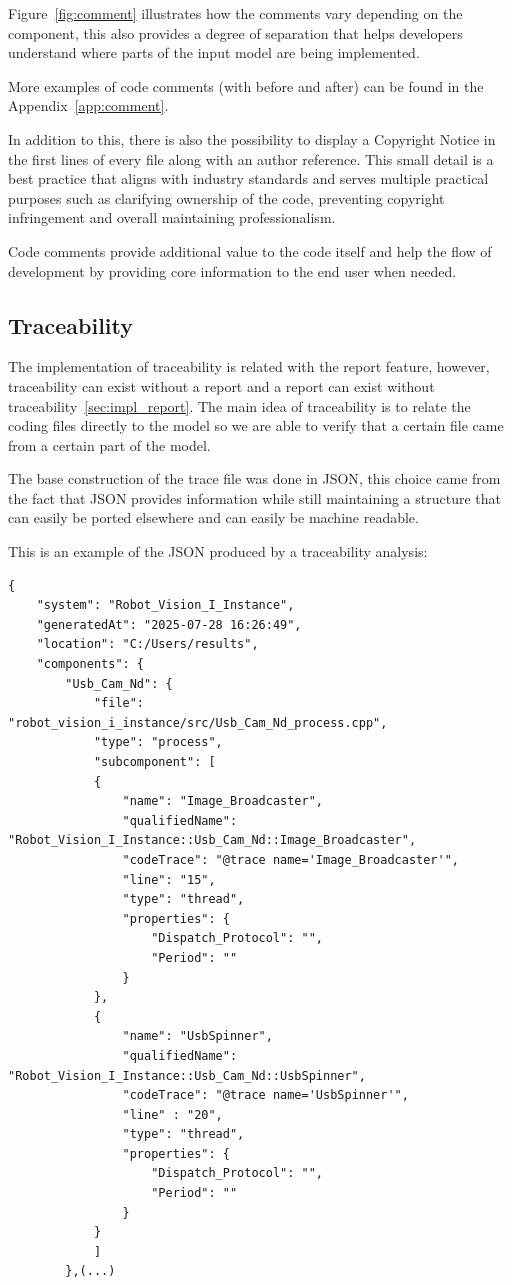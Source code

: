 Figure~\ref{fig:comment} illustrates how the comments vary depending on the component, this also provides a degree of separation that helps developers understand where parts of the input model are being implemented.

More examples of code comments (with before and after) can be found in the Appendix~\ref{app:comment}.

In addition to this, there is also the possibility to display a Copyright Notice in the first lines of every file along with an author reference. This small detail is a best practice that aligns with industry standards and serves multiple practical purposes such as clarifying ownership of the code, preventing copyright infringement and overall maintaining professionalism.

Code comments provide additional value to the code itself and help the flow of development by providing core information to the end user when needed.


\subsection{Traceability}
\label{sec:impl_trace}

The implementation of traceability is related with the report feature, however, traceability can exist without a report and a report can exist without traceability~\ref{sec:impl_report}. The main idea of traceability is to relate the coding files directly to the model so we are able to verify that a certain file came from a certain part of the model.

The base construction of the trace file was done in \gls{JSON}, this choice came from the fact that \gls{JSON} provides information while still maintaining a structure that can easily be ported elsewhere and can easily be machine readable.

This is an example of the \gls{JSON} produced by a traceability analysis:

\begin{verbatim}
{
	"system": "Robot_Vision_I_Instance",
	"generatedAt": "2025-07-28 16:26:49",
	"location": "C:/Users/results",
	"components": {
		"Usb_Cam_Nd": {
			"file": "robot_vision_i_instance/src/Usb_Cam_Nd_process.cpp",
			"type": "process",
			"subcomponent": [
			{
				"name": "Image_Broadcaster",
				"qualifiedName": "Robot_Vision_I_Instance::Usb_Cam_Nd::Image_Broadcaster",
				"codeTrace": "@trace name='Image_Broadcaster'",
				"line": "15",
				"type": "thread",
				"properties": {
					"Dispatch_Protocol": "",
					"Period": ""
				}
			},
			{
				"name": "UsbSpinner",
				"qualifiedName": "Robot_Vision_I_Instance::Usb_Cam_Nd::UsbSpinner",
				"codeTrace": "@trace name='UsbSpinner'",
				"line" : "20",
				"type": "thread",
				"properties": {
					"Dispatch_Protocol": "",
					"Period": ""
				}
			}
			]
		},(...)
\end{verbatim}

